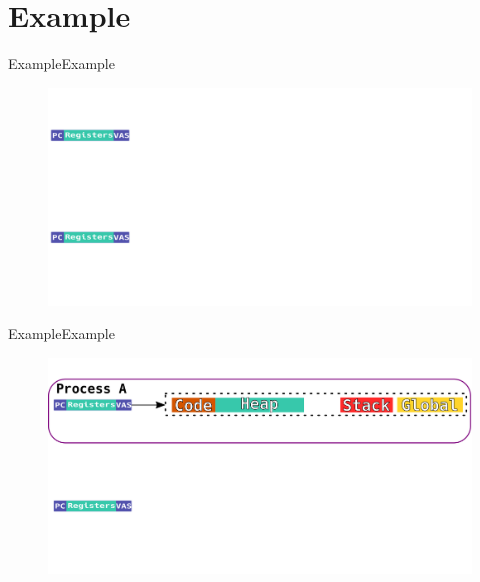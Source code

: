 \documentclass[10pt]{beamer}
\begin{document}
\section{Example}
\begin{frame}{Example}{Example}
  \begin{figure}[ht]
    \centering
    \includegraphics[width=1\textwidth, keepaspectratio=true]{images/spacejmp_example_a.png}
  \end{figure}
\end{frame}

\begin{frame}{Example}{Example}
  \begin{figure}[ht]
    \centering
    \includegraphics[width=1\textwidth, keepaspectratio=true]{images/spacejmp_example_b.png}
  \end{figure}
\end{frame}
\end{document}
